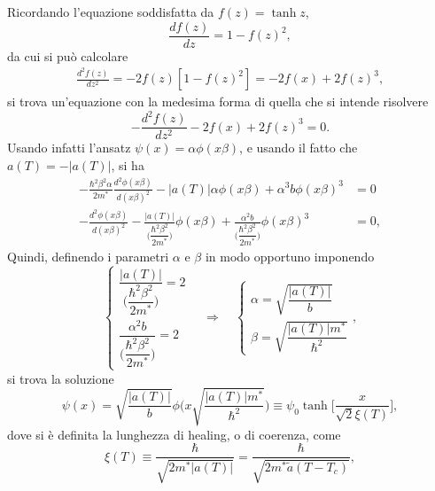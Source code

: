Ricordando l'equazione soddisfatta da $f(z) = \tanh{z}$,
\begin{equation}
    \frac{df(z)}{dz} = 1 - f(z)^2,
\end{equation}
da cui si può calcolare
\begin{equation}
    \begin{split}
        \frac{d^2f(z)}{dz^2} = -2f(z)[1 - f(z)^2] = -2f(x) + 2f(z)^3,
    \end{split}
\end{equation}
si trova un'equazione con la medesima forma di quella che si intende risolvere
\begin{equation}
    -\frac{d^2f(z)}{dz^2} - 2f(x) + 2f(z)^3 = 0.
\end{equation}
Usando infatti l'ansatz $\psi(x) = \alpha\phi(x\beta)$, e usando il fatto che $a(T) = -|a(T)|$, si ha
\begin{equation}
    \begin{split}
        -\frac{\hbar^2\beta^2\alpha}{2m^*}\frac{d^2\phi(x\beta)}{d(x\beta)^2} - |a(T)|\alpha\phi(x\beta) + \alpha^3b\phi(x\beta)^3 &= 0 \\
        -\frac{d^2\phi(x\beta)}{d(x\beta)^2} - \frac{|a(T)|}{\bigg(\dfrac{\hbar^2\beta^2}{2m^*}\bigg)}\phi(x\beta) + \frac{\alpha^2b}{\bigg(\dfrac{\hbar^2\beta^2}{2m^*}\bigg)}\phi(x\beta)^3 &= 0,
    \end{split}
\end{equation}
Quindi, definendo i parametri $\alpha$ e $\beta$ in modo opportuno imponendo
\begin{equation}
    \begin{cases}
        \dfrac{|a(T)|}{\bigg(\dfrac{\hbar^2\beta^2}{2m^*}\bigg)} = 2 \\[5ex]
        \dfrac{\alpha^2b}{\bigg(\dfrac{\hbar^2\beta^2}{2m^*}\bigg)} = 2
    \end{cases}\quad\Longrightarrow\quad
    \begin{cases}
        \alpha = \sqrt{\dfrac{|a(T)|}{b}} \\[2ex]
        \beta = \sqrt{\dfrac{|a(T)|m^*}{\hbar^2}}
    \end{cases},
\end{equation}
si trova la soluzione 
\begin{equation}
    \psi(x) = \sqrt{\frac{|a(T)|}{b}}\phi\bigg(x\sqrt{\frac{|a(T)|m^*}{\hbar^2}}\bigg) \equiv \psi_0\tanh{\bigg[\frac{x}{\sqrt{2}\xi(T)}\bigg]},
\end{equation}
dove si è definita la lunghezza di healing, o di coerenza, come 
\begin{equation}
    \xi(T) \equiv \frac{\hbar}{\sqrt{2m^*|a(T)|}} = \frac{\hbar}{\sqrt{2m^*\tilde{a}(T - T_c)}},
\end{equation}

